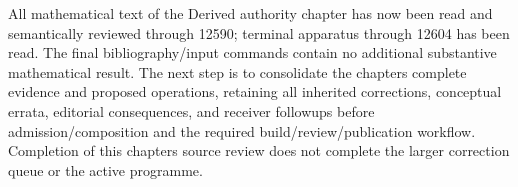 \documentclass[11pt]{article}
\begin{document}
All mathematical text of the Derived authority chapter has now been read and semantically reviewed through 12590; terminal apparatus through 12604 has been read. The final bibliography/\allowbreak{}input commands contain no additional substantive mathematical result. The next step is to consolidate the chapter\textquotesingle s complete evidence and proposed operations,\allowbreak{} retaining all inherited corrections,\allowbreak{} conceptual errata,\allowbreak{} editorial consequences,\allowbreak{} and receiver followups before admission/\allowbreak{}composition and the required build/\allowbreak{}review/\allowbreak{}publication workflow. Completion of this chapter\textquotesingle s source review does not complete the larger correction queue or the active programme.
\clearpage
\end{document}
